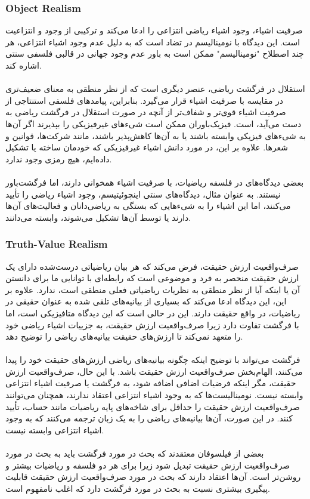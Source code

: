 \documentclass[10pt,a4paper]{article}
\begin{document}
                    \subsubsection{Object Realism}
صرفیت اشیاء، وجود اشیاء ریاضی انتزاعی را ادعا می‌کند و ترکیبی از وجود و انتزاعیت است. این دیدگاه با نومینالیسم در تضاد است که به دلیل عدم وجود اشیاء انتزاعی، هر چند اصطلاح "نومینالیسم" ممکن است به باور عدم وجود جهانی در قالبی فلسفی سنتی اشاره کند.
                        \\
                        \\
استقلال در فرگشت ریاضی، عنصر دیگری است که از نظر منطقی به معنای ضعیف‌تری در مقایسه با صرفیت اشیاء قرار می‌گیرد. بنابراین، پیامدهای فلسفی استنتاجی از صرفیت اشیاء قوی‌تر و شفاف‌تر از آنچه در صورت استقلال در فرگشت ریاضی به دست می‌آید، است. فیزیک‌باوران ممکن است شیء‌های غیرفیزیکی را بپذیرند اگر آن‌ها به شیء‌های فیزیکی وابسته باشند یا به آن‌ها کاهش‌پذیر باشند، مانند شرکت‌ها، قوانین و شعرها. علاوه بر این، در مورد دانش اشیاء غیرفیزیکی که خودمان ساخته یا تشکیل داده‌ایم، هیچ رمزی وجود ندارد.
                        \\
                        \\
بعضی دیدگاه‌های در فلسفه ریاضیات، با صرفیت اشیاء همخوانی دارند، اما فرگشت‌باور نیستند. به عنوان مثال، دیدگاه‌های سنتی اینچوئیتیسم، وجود اشیاء ریاضی را تأیید می‌کنند، اما این اشیاء را به شیء‌هایی که بستگی به ریاضی‌دانان و فعالیت‌های آن‌ها دارند یا توسط آن‌ها تشکیل می‌شوند، وابسته می‌دانند.
                    \subsubsection{Truth-Value Realism}
صرف‌واقعیت ارزش حقیقت، فرض می‌کند که هر بیان ریاضیاتی درست‌شده دارای یک ارزش حقیقت منحصر به فرد و موضوعی است که رابطه‌ای با توانایی ما برای دانستن آن یا اینکه آیا از نظر منطقی به نظریات ریاضیاتی فعلی منطقی است، ندارد. علاوه بر این، این دیدگاه ادعا می‌کند که بسیاری از بیانیه‌های تلقی شده به عنوان حقیقی در ریاضیات، در واقع حقیقت دارند. این در حالی است که این دیدگاه متافیزیکی است، اما با فرگشت تفاوت دارد زیرا صرف‌واقعیت ارزش حقیقت، به جزییات اشیاء ریاضی خود را متعهد نمی‌کند تا ارزش‌های حقیقت بیانیه‌های ریاضی را توضیح دهد.
                        \\
                        \\
فرگشت می‌تواند با توضیح اینکه چگونه بیانیه‌های ریاضی ارزش‌های حقیقت خود را پیدا می‌کنند، الهام‌بخش صرف‌واقعیت ارزش حقیقت باشد. با این حال، صرف‌واقعیت ارزش حقیقت، مگر اینکه فرضیات اضافی اضافه شود، به فرگشت یا صرفیت اشیاء انتزاعی وابسته نیست. نومینالیست‌ها که به وجود اشیاء انتزاعی اعتقاد ندارند، همچنان می‌توانند صرف‌واقعیت ارزش حقیقت را حداقل برای شاخه‌های پایه ریاضیات مانند حساب، تأیید کنند. در این صورت، آن‌ها بیانیه‌های ریاضی را به یک زبان ترجمه می‌کنند که به وجود اشیاء انتزاعی وابسته نیست.
                        \\
                        \\
بعضی از فیلسوفان معتقدند که بحث در مورد فرگشت باید به بحث در مورد صرف‌واقعیت ارزش حقیقت تبدیل شود زیرا برای هر دو فلسفه و ریاضیات بیشتر و روشن‌تر است. آن‌ها اعتقاد دارند که بحث در مورد صرف‌واقعیت ارزش حقیقت قابلیت پیگیری بیشتری نسبت به بحث در مورد فرگشت دارد که اغلب نامفهوم است.
\end{document}
